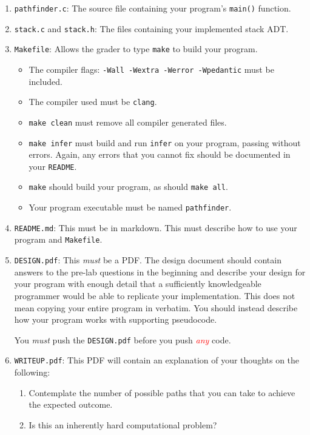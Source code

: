 \documentclass[11pt]{article}
\begin{document}
\begin{enumerate}
    \item \texttt{pathfinder.c}: The source file containing your program's
        \texttt{main()} function.
    \item \texttt{stack.c} and \texttt{stack.h}: The files containing your
        implemented stack ADT.
    \item \texttt{Makefile}: Allows the grader to type \texttt{make} to build
        your program.
    \begin{itemize}
        \item The compiler flags: \texttt{-Wall -Wextra -Werror -Wpedantic} must
            be included.
        \item The compiler used must be \texttt{clang}.
        \item \texttt{make clean} must remove all compiler generated files.
        \item \texttt{make infer} must build and run \texttt{infer} on your
            program, passing without errors. Again, any errors that you cannot
            fix should be documented in your \texttt{README}.
        \item \texttt{make} should build your program, as should \texttt{make
            all}.
        \item Your program executable must be named \texttt{pathfinder}.
    \end{itemize}
    \item \texttt{README.md}: This must be in markdown.  This must describe how
        to use your program and \texttt{Makefile}.
    \item \texttt{DESIGN.pdf}: This \emph{must} be a PDF. The design document
        should contain answers to the pre-lab questions in the beginning and
	describe your design for your program with enough detail that a
        sufficiently knowledgeable programmer would be able to replicate your
        implementation. This does not mean copying your entire program in
        verbatim. You should instead describe how your program works with
	supporting pseudocode. 

You \emph{must} push the \texttt{DESIGN.pdf} before you
	push \textcolor{red}{\emph{any}} code.
    \item \texttt{WRITEUP.pdf}: This PDF will contain an explanation of your thoughts on the following:
             \begin{enumerate}
                \item Contemplate the number of possible paths that you can take to achieve the expected outcome.
                \item Is this an inherently hard computational problem?
             \end{enumerate}
\end{enumerate}
\end{document}
